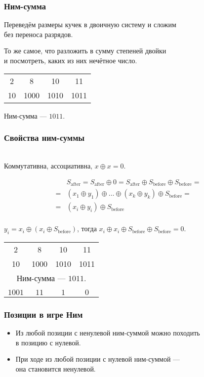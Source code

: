 \begin{frame} \frametitle{Ним-сумма}
	Переведём размеры кучек в двоичную систему и сложим \\
	без переноса разрядов.

	То же самое, что разложить в сумму степеней двойки \\
	и посмотреть, каких из них нечётное число. \medskip

\begin{center}\begin{tabular}{cccc}
2 & 8 & 10 & 11 \\
{\small 10} & {\small 1000} & {\small 1010} & {\small 1011}
\end{tabular}

Ним-сумма — $1011$. \end{center}
\end{frame}

\begin{frame} \frametitle{Свойства ним-суммы} \ \\ [-0.4cm]
	Коммутативна, ассоциативна, $x \oplus x = 0$. \vspace{-0.8cm}
\renewcommand{\sb}{S_{\text{before}}}
\newcommand{\sa}{S_{\text{after}}}

\begin{align*}
&	\sa = \sa \oplus 0 = \sa \oplus \sb \oplus \sb = \\
= &	(x_1 \oplus y_1) \oplus \ldots \oplus (x_k \oplus y_k) \oplus \sb = \\
= & (x_i \oplus y_i) \oplus \sb \\
\end{align*} \vspace{-1.3cm} \pause

$y_i = x_i \oplus (x_i \oplus \sb)$, тогда $x_i \oplus x_i \oplus \sb \oplus \sb = 0$. \pause

\begin{center}\begin{tabular}{cccc}
2 & 8 & 10 & 11 \\
{\small 10} & {\small 1000} & {\small 1010} & {\small 1011} \\
\multicolumn{4}{c}{Ним-сумма — $1011$.} \\ \pause
\phantom{ававав} & \phantom{ававав} & \phantom{ававав} & \phantom{ававав} \\
{\small $1001$} & {\small $11$} & {\small $1$} & {\small $0$} \\
\end{tabular} \end{center}
\end{frame}

\begin{frame} \frametitle{Позиции в игре Ним}
\begin{itemize} \itemsep=5mm
	\item Из любой позиции с ненулевой ним-суммой можно походить \\
	в позицию с нулевой.
	\item При ходе из любой позиции с нулевой ним-суммой — \\
	она становится ненулевой.
\end{itemize}
\end{frame}
